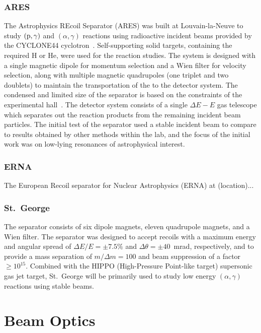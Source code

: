 \subsubsection{ARES}
The Astrophysics REcoil Separator (ARES) was built at Louvain-la-Neuve to
study $(\rm{p},\gamma)$ and $(\alpha,\gamma)$ reactions using radioactive
incident beams provided by the CYCLONE44 cyclotron~\cite{Angulo2001}.
Self-supporting solid targets, containing the required H or He, were used for
the reaction studies. The system is designed with a single magnetic dipole for
momentum selection and a Wien filter for velocity selection, along with
multiple magnetic quadrupoles (one triplet and two doublets) to maintain the
transportation of the to the
detector system. The condensed and limited size of the separator is based on
the constraints of the experimental hall~\cite{Couder2003}. The detector system
consists of a single $\Delta E − E$ gas telescope which separates out the reaction
products from the remaining incident beam particles. The initial test of the
separator used a stable incident beam to compare to results obtained by other
methods within the lab, and the focus of the initial work was on low-lying
resonances of astrophysical interest.

\subsubsection{ERNA}
The European Recoil separator for Nuclear Astrophysics (ERNA) at (location)...

\subsubsection{St.\ George}
The separator consists of six dipole magnets, eleven quadrupole magnets, and a
Wien filter. The separator was designed to accept recoils with a maximum
energy and angular spread of $\Delta E/E = \pm7.5\%$ and
$\Delta\theta = \pm40$~mrad, respectively, and to provide a mass separation
of $m/\Delta m = 100$ and beam suppression of a factor $\geq 10^{15}$. Combined
with the HIPPO (High-Pressure Point-like target) supersonic gas jet target,
St.\ George will be primarily used to study low energy $(\alpha,\gamma)$
reactions using stable beams.



\section{Beam Optics}
\label{sec:ch01-beam-optics}

